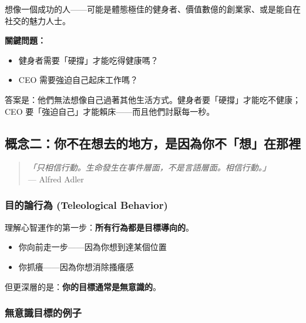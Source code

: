 \documentclass[12pt,a4paper]{article}
\begin{document}
想像一個成功的人——可能是體態極佳的健身者、價值數億的創業家、或是能自在社交的魅力人士。

\textbf{關鍵問題：}
\begin{itemize}
    \item 健身者需要「硬撐」才能吃得健康嗎？
    \item CEO 需要強迫自己起床工作嗎？
\end{itemize}

答案是：他們無法想像自己過著其他生活方式。健身者要「硬撐」才能吃不健康；CEO 要「強迫自己」才能賴床——而且他們討厭每一秒。


\subsection{概念二：你不在想去的地方，是因為你不「想」在那裡}

\begin{quote}
\textit{「只相信行動。生命發生在事件層面，不是言語層面。相信行動。」}\\
\hfill — Alfred Adler
\end{quote}

\subsubsection{目的論行為 (Teleological Behavior)}

理解心智運作的第一步：\textbf{所有行為都是目標導向的}。

\begin{itemize}
    \item 你向前走一步——因為你想到達某個位置
    \item 你抓癢——因為你想消除搔癢感
\end{itemize}

但更深層的是：\textbf{你的目標通常是無意識的}。

\subsubsection{無意識目標的例子}
\end{document}
